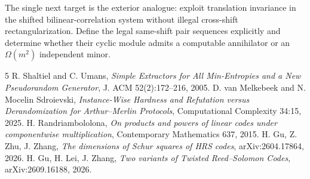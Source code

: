\documentclass[11pt]{article}
\begin{document}
The single next target is the exterior analogue: exploit translation invariance in the shifted bilinear-correlation system without illegal cross-shift rectangularization. Define the legal same-shift pair sequences explicitly and determine whether their cyclic module admits a computable annihilator or an \(\Omega(m^2)\) independent minor.

\begin{thebibliography}{5}
 R. Shaltiel and C. Umans, \emph{Simple Extractors for All Min-Entropies and a New Pseudorandom Generator}, J. ACM 52(2):172--216, 2005.
 D. van Melkebeek and N. Mocelin Sdroievski, \emph{Instance-Wise Hardness and Refutation versus Derandomization for Arthur--Merlin Protocols}, Computational Complexity 34:15, 2025.
 H. Randriambololona, \emph{On products and powers of linear codes under componentwise multiplication}, Contemporary Mathematics 637, 2015.
 H. Gu, Z. Zhu, J. Zhang, \emph{The dimensions of Schur squares of HRS codes}, arXiv:2604.17864, 2026.
 H. Gu, H. Lei, J. Zhang, \emph{Two variants of Twisted Reed--Solomon Codes}, arXiv:2609.16188, 2026.
\end{thebibliography}
\end{document}
